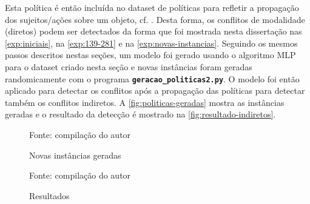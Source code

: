 Esta política é então incluída no dataset de políticas para refletir a propagação dos sujeitos/ações sobre um objeto, cf. . Desta forma, os conflitos de modalidade (diretos) podem ser detectados da forma que foi mostrada nesta dissertação nas \autoref{exp:iniciais}, na \autoref{exp:139-281} e na  \autoref{exp:novas-instancias}. Seguindo os mesmos passos descritos nestas seções, um modelo foi gerado usando o algoritmo MLP para o dataset criado nesta seção e novas instâncias foram geradas randomicamente com o programa \texttt{\textbf{geracao\_politicas2.py}}. O modelo foi então aplicado para detectar os conflitos após a propagação das políticas para detectar também os conflitos indiretos. A \autoref{fig:politicas-geradas} mostra as instâncias geradas e o resultado da detecção é mostrado na \autoref{fig:resultado-indiretos}.

\begin{figure}[!h]
	\centering
	\caption{Novas instâncias geradas}
	
	\label{fig:politicas-geradas}
	{\scriptsize Fonte: compilação do autor}
\end{figure}

\begin{figure}[!h]
	\centering
	\caption{Resultados}
	
	\label{fig:resultado-indiretos}
	{\scriptsize Fonte: compilação do autor}
\end{figure}

